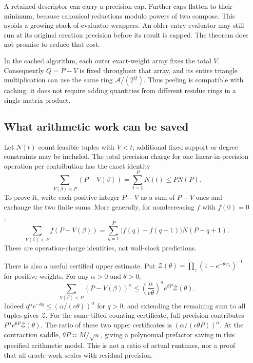A retained descriptor can carry a precision cap. Further caps flatten
to their minimum, because canonical reductions modulo powers of two
compose. This avoids a growing stack of evaluator wrappers. An older
entry evaluator may still run at its original creation precision before
its result is capped. The theorem does not promise to reduce that cost.

In the cached algorithm, each outer exact-weight array fixes the total
$V$. Consequently $Q=P-V$ is fixed throughout that array, and its entire
triangle multiplication can use the same ring $\mathcal A/(2^Q)$.
Thus peeling is compatible with caching; it does not require adding
quantities from different residue rings in a single matrix product.

\subsection{What arithmetic work can be saved}

Let $N(t)$ count feasible tuples with $V<t$; additional fixed support or
degree constraints may be included. The total precision charge for one
linear-in-precision operation per contribution has the exact identity
\begin{equation}\label{eq:layercake}
 \sum_{V(\beta)<P}(P-V(\beta))=\sum_{t=1}^P N(t)
 \le P N(P).
\end{equation}
To prove it, write each positive integer $P-V$ as a sum of $P-V$ ones
and exchange the two finite sums. More generally, for nondecreasing $f$
with $f(0)=0$,
\begin{equation}\label{eq:generalcharge}
 \sum_{V(\beta)<P} f(P-V(\beta))
 =\sum_{q=1}^P\bigl(f(q)-f(q-1)\bigr)N(P-q+1).
\end{equation}
These are operation-charge identities, not wall-clock predictions.

There is also a useful certified upper estimate. Put
$\mathcal Z(\theta)=\prod_z(1-e^{-\theta w_z})^{-1}$ for positive weights.
For any $\alpha>0$ and $\theta>0$,
\begin{equation}\label{eq:tilted-work}
 \sum_{V(\beta)<P}(P-V(\beta))^\alpha
 \le\left(\frac{\alpha}{e\theta}\right)^\alpha
       e^{\theta P}\mathcal Z(\theta).
\end{equation}
Indeed $q^\alpha e^{-\theta q}\le(\alpha/(e\theta))^\alpha$ for $q>0$,
and extending the remaining sum to all tuples gives $\mathcal Z$.
For the same tilted counting certificate, full precision contributes
$P^\alpha e^{\theta P}\mathcal Z(\theta)$. The ratio of these two upper
certificates is $(\alpha/(e\theta P))^\alpha$.
At the contraction saddle, $\theta P\asymp M/\sqrt u$, giving a
polynomial prefactor saving in this specified arithmetic model.
This is not a ratio of actual runtimes, nor a proof that all oracle work
scales with residual precision.

